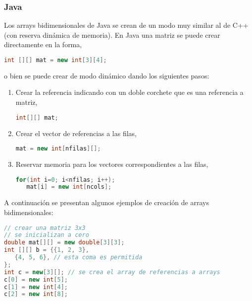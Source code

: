 \subsubsection{Java}
Los arrays bidimensionales de Java se crean de un modo muy similar al de C++ (con reserva dinámica de memoria). En Java una matriz se puede crear directamente en la forma,
\begin{lstlisting}[language=Java]
int [][] mat = new int[3][4];
\end{lstlisting}

o bien se puede crear de modo dinámico dando los siguientes pasos:

\begin{enumerate}
	\item Crear la referencia indicando con un doble corchete que es una referencia a matriz,
	\begin{lstlisting}[language=Java]
int[][] mat;
	\end{lstlisting}
	
	\item Crear el vector de referencias a las filas,
	
	\begin{lstlisting}[language=Java]
mat = new int[nfilas][];
	\end{lstlisting}
	
	\item Reservar memoria para los vectores correspondientes a las filas,
	
	\begin{lstlisting}[language=Java]
for(int i=0; i<nfilas; i++);
   mat[i] = new int[ncols];
	\end{lstlisting}
\end{enumerate}

A continuación se presentan algunos ejemplos de creación de arrays bidimensionales:
\begin{lstlisting}[language=Java]
// crear una matriz 3x3
// se inicializan a cero
double mat[][] = new double[3][3];
int [][] b = {{1, 2, 3},
   {4, 5, 6}, // esta coma es permitida
};
int c = new[3][]; // se crea el array de referencias a arrays
c[0] = new int[5];
c[1] = new int[4];
c[2] = new int[8];
\end{lstlisting}